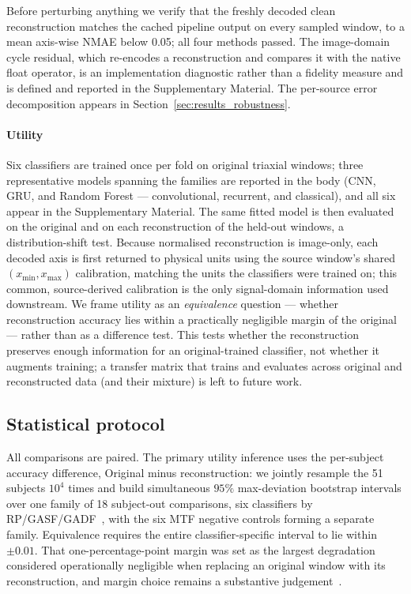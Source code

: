\documentclass[preprint,12pt]{elsarticle}
\begin{document}
Before perturbing anything we verify that the freshly decoded clean reconstruction matches the cached pipeline output on every sampled window, to a mean axis-wise NMAE below 0.05; all four methods passed. The image-domain cycle residual, which re-encodes a reconstruction and compares it with the native float operator, is an implementation diagnostic rather than a fidelity measure and is defined and reported in the Supplementary Material. The per-source error decomposition appears in Section~\ref{sec:results_robustness}.

\paragraph{Utility}
Six classifiers are trained once per fold on original triaxial windows; three representative models spanning the families are reported in the body (CNN, GRU, and Random Forest --- convolutional, recurrent, and classical), and all six appear in the Supplementary Material. The same fitted model is then evaluated on the original and on each reconstruction of the held-out windows, a distribution-shift test. Because normalised reconstruction is image-only, each decoded axis is first returned to physical units using the source window's shared \((x_{\min},x_{\max})\) calibration, matching the units the classifiers were trained on; this common, source-derived calibration is the only signal-domain information used downstream. We frame utility as an \emph{equivalence} question --- whether reconstruction accuracy lies within a practically negligible margin of the original --- rather than as a difference test. This tests whether the reconstruction preserves enough information for an original-trained classifier, not whether it augments training; a transfer matrix that trains and evaluates across original and reconstructed data (and their mixture) is left to future work.

\subsection{Statistical protocol}\label{sec:statistical_protocol}

All comparisons are paired. The primary utility inference uses the per-subject accuracy difference, Original minus reconstruction: we jointly resample the 51 subjects \(10^4\) times and build simultaneous \(95\%\) max-deviation bootstrap intervals over one family of 18 subject-out comparisons, six classifiers by RP/GASF/GADF~\cite{DavisonHinkley1997,Hall1987}, with the six MTF negative controls forming a separate family. Equivalence requires the entire classifier-specific interval to lie within \(\pm0.01\). That one-percentage-point margin was set as the largest degradation considered operationally negligible when replacing an original window with its reconstruction, and margin choice remains a substantive judgement~\cite{Lakens2017}.
\end{document}
